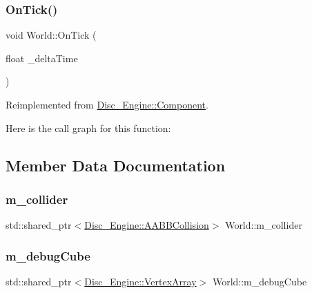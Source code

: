 \subsubsection{\texorpdfstring{On\+Tick()}{OnTick()}}
{\footnotesize\ttfamily void World\+::\+On\+Tick (\begin{DoxyParamCaption}\item[{float}]{\+\_\+delta\+Time }\end{DoxyParamCaption})\hspace{0.3cm}{\ttfamily [virtual]}}



Reimplemented from \mbox{\hyperlink{class_disc___engine_1_1_component_a7e322d37c3f5fa0181f2321d08b14527}{Disc\+\_\+\+Engine\+::\+Component}}.

Here is the call graph for this function\+:


\subsection{Member Data Documentation}
\mbox{\label{class_world_abb8264e9716aeb6867745f5defdb5e55}} 
\subsubsection{\texorpdfstring{m\+\_\+collider}{m\_collider}}
{\footnotesize\ttfamily std\+::shared\+\_\+ptr$<$\mbox{\hyperlink{class_disc___engine_1_1_a_a_b_b_collision}{Disc\+\_\+\+Engine\+::\+A\+A\+B\+B\+Collision}}$>$ World\+::m\+\_\+collider\hspace{0.3cm}{\ttfamily [private]}}

\mbox{\label{class_world_a59bc35e219814aa69f7535ffff5f56c3}} 
\subsubsection{\texorpdfstring{m\+\_\+debug\+Cube}{m\_debugCube}}
{\footnotesize\ttfamily std\+::shared\+\_\+ptr$<$\mbox{\hyperlink{class_disc___engine_1_1_vertex_array}{Disc\+\_\+\+Engine\+::\+Vertex\+Array}}$>$ World\+::m\+\_\+debug\+Cube\hspace{0.3cm}{\ttfamily [private]}}

